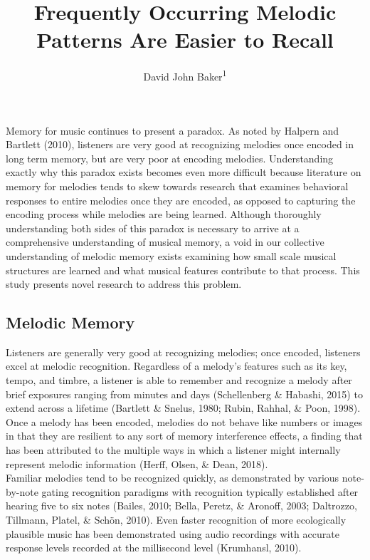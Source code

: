 \documentclass[english,man,floatsintext]{apa6}
\title{Frequently Occurring Melodic Patterns Are Easier to Recall}
\author{David John Baker\textsuperscript{1}}
\date{}
\affiliation{\vspace{0.5cm}\textsuperscript{1} Department of Computing, Goldsmiths, University of London}
\begin{document}
\maketitle

Memory for music continues to present a paradox.
As noted by Halpern and Bartlett (2010), listeners are very good at recognizing melodies once encoded in long term memory, but are very poor at encoding melodies.
Understanding exactly why this paradox exists becomes even more difficult because literature on memory for melodies tends to skew towards research that examines behavioral responses to entire melodies once they are encoded, as opposed to capturing the encoding process while melodies are being learned.
Although thoroughly understanding both sides of this paradox is necessary to arrive at a comprehensive understanding of musical memory, a void in our collective understanding of melodic memory exists examining how small scale musical structures are learned and what musical features contribute to that process.
This study presents novel research to address this problem.

\hypertarget{melodic-memory}{%
\subsection{Melodic Memory}\label{melodic-memory}}

Listeners are generally very good at recognizing melodies; once encoded, listeners excel at melodic recognition.
Regardless of a melody's features such as its key, tempo, and timbre, a listener is able to remember and recognize a melody after brief exposures ranging from minutes and days (Schellenberg \& Habashi, 2015) to extend across a lifetime (Bartlett \& Snelus, 1980; Rubin, Rahhal, \& Poon, 1998).
Once a melody has been encoded, melodies do not behave like numbers or images in that they are resilient to any sort of memory interference effects, a finding that has been attributed to the multiple ways in which a listener might internally represent melodic information (Herff, Olsen, \& Dean, 2018).\\
Familiar melodies tend to be recognized quickly, as demonstrated by various note-by-note gating recognition paradigms with recognition typically established after hearing five to six notes (Bailes, 2010; Bella, Peretz, \& Aronoff, 2003; Daltrozzo, Tillmann, Platel, \& Schön, 2010).
Even faster recognition of more ecologically plausible music has been demonstrated using audio recordings with accurate response levels recorded at the millisecond level (Krumhansl, 2010).
\end{document}
